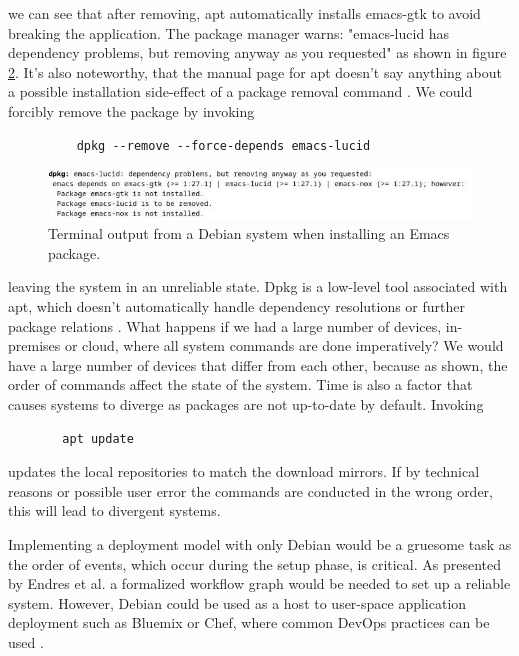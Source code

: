 we can see that after removing, apt automatically installs emacs-gtk
to avoid breaking the application. The package manager warns:
"emacs-lucid has dependency problems, but removing anyway as you
requested" as shown in figure \ref{deb_remove}. It's also noteworthy,
that the manual page for apt doesn't say anything about a possible
installation side-effect of a package removal command
\cite{ubuntuUbuntuManpage}. We could forcibly remove the package by
invoking
\begin{figure}[H]\label{dpkgsnippet}
\begin{lstlisting} 
    dpkg --remove --force-depends emacs-lucid
\end{lstlisting}
\end{figure}
\begin{figure}\label{deb_remove}
\includegraphics[scale=2.0]{latex/kuvat/cropped_apt_output.jpg}
\caption{Terminal output from a Debian system when installing an Emacs package.}
\end{figure}
leaving the system in an unreliable state. Dpkg is a low-level
tool associated with apt, which doesn't automatically handle dependency
resolutions or further package relations
\cite{thiruvathukal2004gentoo}. What happens if we had a large number
of devices, in-premises or cloud, where all system commands are done
imperatively? We would have a large number of devices that differ from
each other, because as shown, the order of commands affect the state
of the system. Time is also a factor that
causes systems to diverge as packages are not up-to-date by
default. Invoking 
\begin{figure}[H]\label{aptupdate}
\begin{lstlisting} 
  apt update
\end{lstlisting}
\end{figure}
updates the local repositories to match the download mirrors. If by
technical reasons or possible user error the commands are conducted in
the wrong order, this will lead to divergent systems.

Implementing a deployment model with only Debian would be a gruesome
task as the order of events, which occur during the setup phase, is
critical. As presented by Endres et al. a formalized workflow graph
would be needed to set up a reliable system. However, Debian could
be used as a host to user-space application deployment such as
Bluemix or Chef, where common DevOps practices can be used
\cite{endres2017declarative}.


